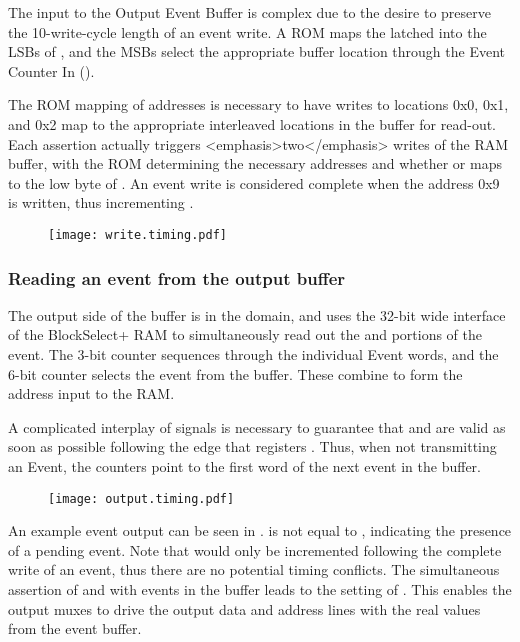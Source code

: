 The input to the Output Event Buffer is complex due to the desire to
preserve the 10-write-cycle length of an event write. A ROM maps the
latched  into the LSBs of
, and the MSBs select the appropriate
buffer location through the Event Counter In
().
        
The ROM mapping of addresses is necessary to have writes to locations
0x0, 0x1, and 0x2 map to the appropriate interleaved locations in the
buffer for read-out.  Each  assertion actually
triggers <emphasis>two</emphasis> writes of the RAM buffer, with the
ROM determining the necessary addresses and whether
 or  maps to the
low byte of . An event write is considered
complete when the address 0x9 is written, thus incrementing
.
        

\begin{figure}[h!]
\texttt{[image: write.timing.pdf]}
\end{figure}                  
                
\subsubsection{Reading an event from the output buffer}
The output side of the buffer is in the 
domain, and uses the 32-bit wide interface of the BlockSelect+ RAM to
simultaneously read out the  and
 portions of the event. The 3-bit
 counter sequences through the individual
Event words, and the 6-bit  counter
selects the event from the buffer. These combine to form the address
input  to the RAM.
   
A complicated interplay of signals is necessary to guarantee that
 and  are valid
as soon as possible following the  edge that
registers . Thus, when not transmitting an Event,
the counters point to the first word of the next event in the buffer.

\begin{figure}[h!]
\texttt{[image: output.timing.pdf]}
\end{figure}                  

An example event output can be seen in . 
is not equal to , indicating the presence of a
pending event. Note that  would only be
incremented following the complete write of an event, thus there are
no potential timing conflicts. The simultaneous assertion of
 and  with events in the
buffer leads to the setting of .  This enables
the output muxes to drive the output data and address lines with the
real values from the event buffer.


